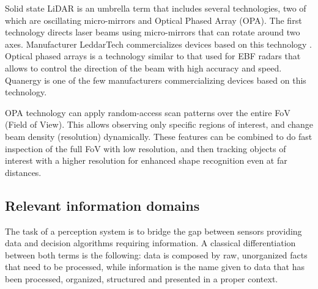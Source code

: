 Solid state LiDAR is an umbrella term that includes several technologies, two 
of which are oscillating micro-mirrors and Optical Phased Array (OPA).
The first technology directs laser beams using micro-mirrors that can 
rotate around two axes. Manufacturer LeddarTech commercializes devices
based on this technology \cite{LeddarTech2016}.
Optical phased arrays \cite{McManamon1996} is a technology similar to that used 
for EBF radars 
that allows to control the direction of the beam with high accuracy and speed.
Quanergy \cite{Eldada2017} is one of the few manufacturers commercializing
devices based on this technology.

OPA technology can apply random-access scan patterns over the entire FoV 
(Field of View). This allows observing only specific regions of interest, and
change beam density (resolution) dynamically. 
These features can be combined to do fast inspection of the full FoV with low
resolution, and then tracking objects of interest with a higher resolution for 
enhanced shape recognition even at far distances.

\subsection{Relevant information domains}
\label{sec:03-d-information-domains}

The task of a perception system is to bridge the gap between sensors providing 
data and decision algorithms requiring information.
A classical differentiation between both terms is the following: data is 
composed by raw, unorganized facts that need to be processed, while  
information is the name given to data that has been processed, organized, 
structured and presented in a proper context.

